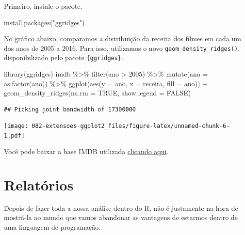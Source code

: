 \documentclass[
]{book}
\newenvironment{Shaded}{\begin{snugshade}}{\end{snugshade}}
\newcommand{\AttributeTok}[1]{\textcolor[rgb]{0.77,0.63,0.00}{#1}}
\newcommand{\ConstantTok}[1]{\textcolor[rgb]{0.00,0.00,0.00}{#1}}
\newcommand{\DecValTok}[1]{\textcolor[rgb]{0.00,0.00,0.81}{#1}}
\newcommand{\FunctionTok}[1]{\textcolor[rgb]{0.00,0.00,0.00}{#1}}
\newcommand{\NormalTok}[1]{#1}
\newcommand{\SpecialCharTok}[1]{\textcolor[rgb]{0.00,0.00,0.00}{#1}}
\newcommand{\StringTok}[1]{\textcolor[rgb]{0.31,0.60,0.02}{#1}}
\begin{document}
Primeiro, instale o pacote.

\begin{Shaded}
\begin{Highlighting}[]
\FunctionTok{install.packages}\NormalTok{(}\StringTok{"ggridges"}\NormalTok{)}
\end{Highlighting}
\end{Shaded}

No gráfico abaixo, comparamos a distribuição da receita dos filmes em cada um dos anos de 2005 a 2016. Para isso, utilizamos o novo \texttt{geom\_density\_ridges()}, disponibilizado pelo pacote \texttt{\{ggridges\}}.

\begin{Shaded}
\begin{Highlighting}[]
\FunctionTok{library}\NormalTok{(ggridges)}
\NormalTok{imdb }\SpecialCharTok{\%\textgreater{}\%}
  \FunctionTok{filter}\NormalTok{(ano }\SpecialCharTok{\textgreater{}} \DecValTok{2005}\NormalTok{) }\SpecialCharTok{\%\textgreater{}\%} 
  \FunctionTok{mutate}\NormalTok{(}\AttributeTok{ano =} \FunctionTok{as.factor}\NormalTok{(ano)) }\SpecialCharTok{\%\textgreater{}\%} 
  \FunctionTok{ggplot}\NormalTok{(}\FunctionTok{aes}\NormalTok{(}\AttributeTok{y =}\NormalTok{ ano, }\AttributeTok{x =}\NormalTok{ receita, }\AttributeTok{fill =}\NormalTok{ ano)) }\SpecialCharTok{+}
  \FunctionTok{geom\_density\_ridges}\NormalTok{(}\AttributeTok{na.rm =} \ConstantTok{TRUE}\NormalTok{, }\AttributeTok{show.legend =} \ConstantTok{FALSE}\NormalTok{)}
\end{Highlighting}
\end{Shaded}

\begin{verbatim}
## Picking joint bandwidth of 17300000
\end{verbatim}

\texttt{[image: 082-extensoes-ggplot2\_files/figure-latex/unnamed-chunk-6-1.pdf]}

Você pode baixar a base IMDB utilizada \href{https://github.com/curso-r/livro-material/raw/master/assets/data/imdb.rds}{clicando aqui}.

\hypertarget{relatorios}{%
\chapter{Relatórios}\label{relatorios}}

Depois de fazer toda a nossa análise dentro do R, não é justamente na hora de mostrá-la ao mundo que vamos abandonar as vantagens de estarmos dentro de uma linguagem de programação.
\end{document}
